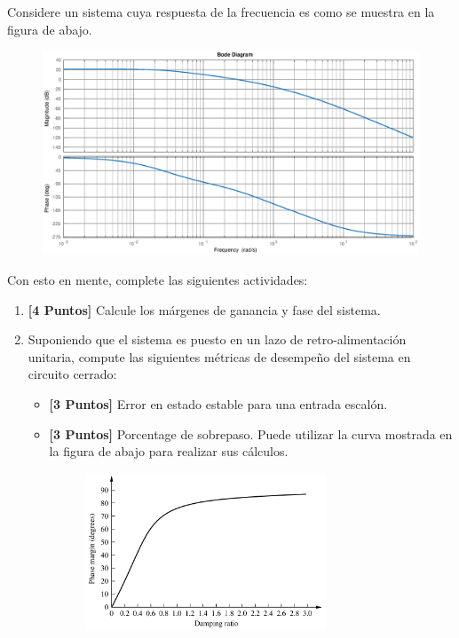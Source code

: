 \documentclass[ a4paper, twoside, 11pt]{article}
\begin{document}
\begin{problem}
Considere un sistema cuya respuesta de la frecuencia es como se muestra en la figura de abajo. 

\begin{figure}[H]
\centering
\includegraphics[width=\columnwidth]{problema-bode.eps}
\end{figure}

Con esto en mente, complete las siguientes actividades: 
\begin{enumerate}[label=\alph*.]
\item \textbf{[4 Puntos]} Calcule los m\'argenes de ganancia y fase del sistema.
\item Suponiendo que el sistema es puesto en un lazo de retro-alimentaci\'on unitaria, compute las siguientes m\'etricas de desempe\~no del sistema en circuito cerrado: 
\begin{itemize}
\item \textbf{[3 Puntos]} Error en estado estable para una entrada escal\'on.
\item \textbf{[3 Puntos]} Porcentage de sobrepaso. Puede utilizar la curva mostrada en la figura de abajo para realizar sus c\'alculos. 
\begin{figure}[htb]
\centering
\includegraphics[width=0.72\textwidth]{Fig_phase-damping.jpg}
\end{figure}

\end{itemize}
\end{enumerate}

\end{problem}
\vspace{\baselineskip}
\end{document}

